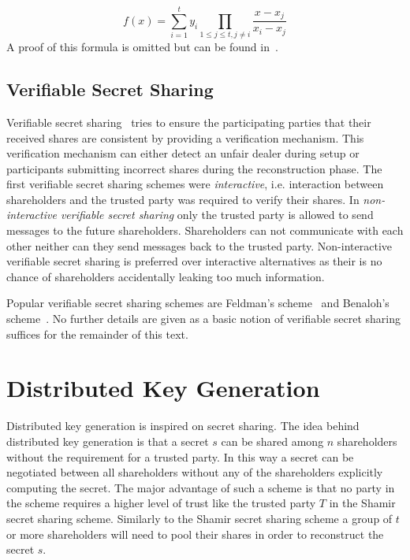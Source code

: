 \begin{equation*}
 f \left( x \right) = \sum^t_{i=1}y_i \prod_{1 \leq j \leq t, j \neq i} \frac{x-x_j}{x_i-x_j}
\end{equation*}
A proof of this formula is omitted but can be found in~\cite{site:proofwiki_lagrange}.

\subsection{Verifiable Secret Sharing}
Verifiable secret sharing~\cite{art:ChorGMA85} tries to ensure the participating parties that their received shares are consistent by providing a verification mechanism. This verification mechanism can either detect an unfair dealer during setup or participants submitting incorrect shares during the reconstruction phase. The first verifiable secret sharing schemes were \textit{interactive}, i.e. interaction between shareholders and the trusted party was required to verify their shares. In \textit{non-interactive verifiable secret sharing} only the trusted party is allowed to send messages to the future shareholders. Shareholders can not communicate with each other neither can they send messages back to the trusted party. Non-interactive verifiable secret sharing is preferred over interactive alternatives as their is no chance of shareholders accidentally leaking too much information.

Popular verifiable secret sharing schemes are Feldman's scheme~\cite{art:Feldman87} and Benaloh's scheme~\cite{art:Benaloh86a}. No further details are given as a basic notion of verifiable secret sharing suffices for the remainder of this text.

\section{Distributed Key Generation}
Distributed key generation is inspired on secret sharing. The idea behind distributed key generation is that a secret $s$ can be shared among $n$ shareholders without the requirement for a trusted party. In this way a secret can be negotiated between all shareholders without any of the shareholders explicitly computing the secret. The major advantage of such a scheme is that no party in the scheme requires a higher level of trust like the trusted party $T$ in the Shamir secret sharing scheme. Similarly to the Shamir secret sharing scheme a group of $t$ or more shareholders will need to pool their shares in order to reconstruct the secret $s$.

